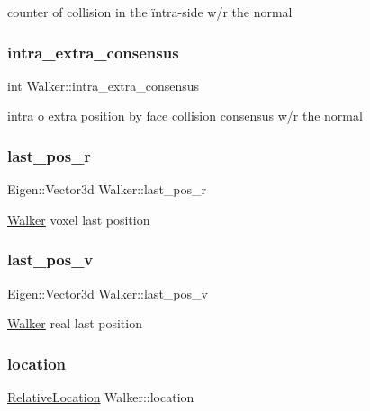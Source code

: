 counter of collision in the ïntra-\/side w/r the normal \mbox{\label{class_walker_aa211ac1f9a396b1bf3b565e0f8ed098a}} 
\subsubsection{\texorpdfstring{intra\+\_\+extra\+\_\+consensus}{intra\_extra\_consensus}}
{\footnotesize\ttfamily int Walker\+::intra\+\_\+extra\+\_\+consensus}

intra o extra position by face collision consensus w/r the normal \mbox{\label{class_walker_a8c78216899e04e9439a991cbad9df36f}} 
\subsubsection{\texorpdfstring{last\+\_\+pos\+\_\+r}{last\_pos\_r}}
{\footnotesize\ttfamily Eigen\+::\+Vector3d Walker\+::last\+\_\+pos\+\_\+r}

\hyperlink{class_walker}{Walker} voxel last position \mbox{\label{class_walker_a2d50601346a754183b38890c18e7a6e7}} 
\subsubsection{\texorpdfstring{last\+\_\+pos\+\_\+v}{last\_pos\_v}}
{\footnotesize\ttfamily Eigen\+::\+Vector3d Walker\+::last\+\_\+pos\+\_\+v}

\hyperlink{class_walker}{Walker} real last position \mbox{\label{class_walker_a77f5c801c38158bb8568f75a22baed20}} 
\subsubsection{\texorpdfstring{location}{location}}
{\footnotesize\ttfamily \hyperlink{class_walker_a24246136a10754791b05cb570dbb8417}{Relative\+Location} Walker\+::location}

